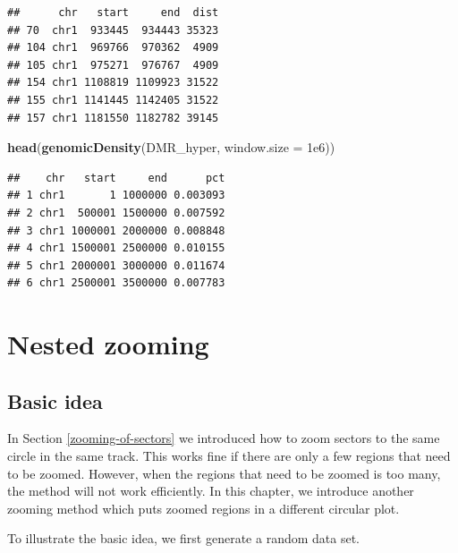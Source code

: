 \documentclass[]{book}
\newenvironment{Shaded}{\begin{snugshade}}{\end{snugshade}}
\newcommand{\KeywordTok}[1]{\textcolor[rgb]{0.13,0.29,0.53}{\textbf{#1}}}
\newcommand{\DataTypeTok}[1]{\textcolor[rgb]{0.13,0.29,0.53}{#1}}
\newcommand{\FloatTok}[1]{\textcolor[rgb]{0.00,0.00,0.81}{#1}}
\newcommand{\NormalTok}[1]{#1}
\theoremstyle{definition}
\theoremstyle{definition}
\theoremstyle{remark}
\begin{document}
\begin{verbatim}
##      chr   start     end  dist
## 70  chr1  933445  934443 35323
## 104 chr1  969766  970362  4909
## 105 chr1  975271  976767  4909
## 154 chr1 1108819 1109923 31522
## 155 chr1 1141445 1142405 31522
## 157 chr1 1181550 1182782 39145
\end{verbatim}

\begin{Shaded}
\begin{Highlighting}[]
\KeywordTok{head}\NormalTok{(}\KeywordTok{genomicDensity}\NormalTok{(DMR_hyper, }\DataTypeTok{window.size =} \FloatTok{1e6}\NormalTok{))}
\end{Highlighting}
\end{Shaded}

\begin{verbatim}
##    chr   start     end      pct
## 1 chr1       1 1000000 0.003093
## 2 chr1  500001 1500000 0.007592
## 3 chr1 1000001 2000000 0.008848
## 4 chr1 1500001 2500000 0.010155
## 5 chr1 2000001 3000000 0.011674
## 6 chr1 2500001 3500000 0.007783
\end{verbatim}

\chapter{Nested zooming}\label{nested-zooming}

\section{Basic idea}\label{basic-idea}

In Section \ref{zooming-of-sectors} we introduced how to zoom sectors to
the same circle in the same track. This works fine if there are only a
few regions that need to be zoomed. However, when the regions that need
to be zoomed is too many, the method will not work efficiently. In this
chapter, we introduce another zooming method which puts zoomed regions
in a different circular plot.

To illustrate the basic idea, we first generate a random data set.
\end{document}
